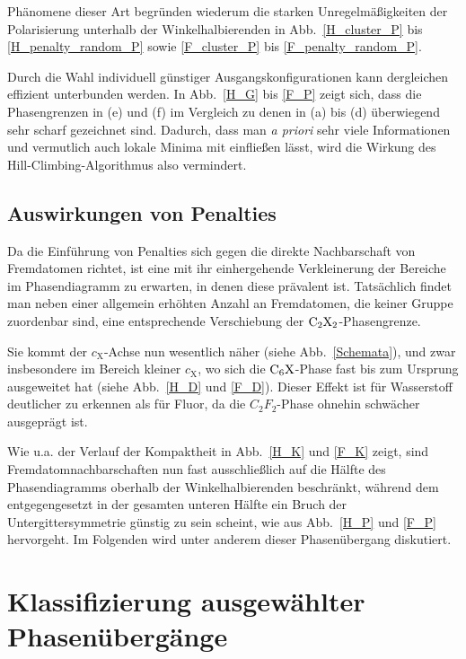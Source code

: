 \documentclass[a4paper, 10pt, twoside, openany]{book} %
\def \cX {c_\mathrm{X}}
\begin{document}
	Phänomene dieser Art begründen wiederum die starken Unregelmäßigkeiten der Polarisierung unterhalb der Winkelhalbierenden in Abb.~\ref{H_cluster_P} bis \ref{H_penalty_random_P} sowie \ref{F_cluster_P} bis \ref{F_penalty_random_P}.
	
	Durch die Wahl individuell günstiger Ausgangskonfigurationen kann dergleichen effizient unterbunden werden. In Abb.~\ref{H_G} bis \ref{F_P} zeigt sich, dass die Phasengrenzen in (e) und (f) im Vergleich zu denen in (a) bis (d) überwiegend sehr scharf gezeichnet sind. Dadurch, dass man \emph{a priori} sehr viele Informationen und vermutlich auch lokale Minima mit einfließen lässt, wird die Wirkung des Hill-Climbing-Algorithmus also vermindert.
	
	\subsection{Auswirkungen von Penalties}
	
	Da die Einführung von Penalties sich gegen die direkte Nachbarschaft von Fremdatomen richtet, ist eine mit ihr einhergehende Verkleinerung der Bereiche im Phasendiagramm zu erwarten, in denen diese prävalent ist. Tatsächlich findet man neben einer allgemein erhöhten Anzahl an Fremdatomen, die keiner Gruppe zuordenbar sind, eine entsprechende Verschiebung der $\rm C_2X_2$-Phasengrenze.
	
	Sie kommt der $\cX$-Achse nun wesentlich näher (siehe Abb.~\ref{Schemata}), und zwar insbesondere im Bereich kleiner $\cX$, wo sich die $\rm C_6X$-Phase fast bis zum Ursprung ausgeweitet hat (siehe Abb.~\ref{H_D} und \ref{F_D}). Dieser Effekt ist für Wasserstoff deutlicher zu erkennen als für Fluor, da die $C_2F_2$-Phase ohnehin schwächer ausgeprägt ist.
	
	Wie u.a. der Verlauf der Kompaktheit in Abb.~\ref{H_K} und \ref{F_K} zeigt, sind Fremdatomnachbarschaften nun fast ausschließlich auf die Hälfte des Phasendiagramms oberhalb der Winkelhalbierenden beschränkt, während dem entgegengesetzt in der gesamten unteren Hälfte ein Bruch der Untergittersymmetrie günstig zu sein scheint, wie aus Abb.~\ref{H_P} und \ref{F_P} hervorgeht. Im Folgenden wird unter anderem dieser Phasenübergang diskutiert.
	
	\section{Klassifizierung ausgewählter Phasenübergänge}
	\label{Klassifizierung ausgewaehlter Phasenuebergaenge}
	
\end{document}
